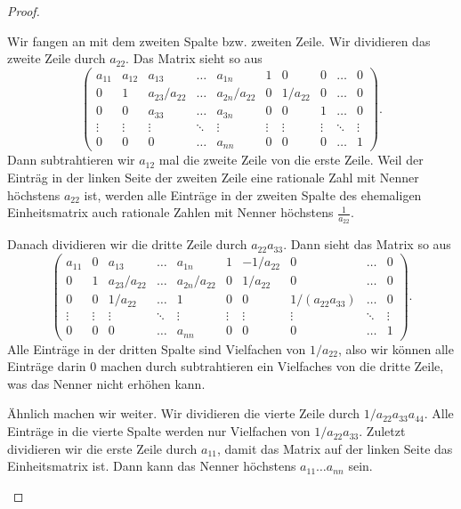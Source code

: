 \begin{proof}
\begin{parts}
		Wir fangen an mit dem zweiten Spalte bzw. zweiten Zeile. Wir dividieren das zweite Zeile durch $a_{22}$. Das Matrix sieht so aus
		\[
			\left( 
				\begin{array}{ccccc|ccccc}
					a_{11} & a_{12} & a_{13} & \dots & a_{1n} & 1 & 0 & 0 & \dots & 0\\
					0 & 1 & a_{23} / a_{22} & \dots & a_{2n} / a_{22} & 0 & 1 / a_{22} & 0 & \dots & 0\\
					0 & 0 & a_{33} & \dots & a_{3n} & 0 & 0 & 1 & \dots & 0\\
					\vdots & \vdots & \vdots & \ddots & \vdots & \vdots & \vdots & \vdots & \ddots & \vdots \\
					0 & 0 & 0 & \dots & a_{nn} & 0 & 0 & 0 & \dots & 1
				\end{array}
			\right)  
		.\] 
		Dann subtrahtieren wir $a_{12}$ mal die zweite Zeile von die erste Zeile. Weil der Einträg in der linken Seite der zweiten Zeile eine rationale Zahl mit Nenner höchstens $a_{22}$ ist, werden alle Einträge in der zweiten Spalte des ehemaligen Einheitsmatrix auch rationale Zahlen mit Nenner höchstens $\frac{1}{a_{22}}$.

		Danach dividieren wir die dritte Zeile durch $a_{22}a_{33}$. Dann sieht das Matrix so aus
			\[
		\left( 
		\begin{array}{ccccc|ccccc}
			a_{11} & 0 & a_{13} & \dots & a_{1n} & 1 & -1/a_{22} & 0 & \dots & 0\\
			0 & 1 & a_{23} / a_{22} & \dots & a_{2n} / a_{22} & 0 & 1 / a_{22} & 0 & \dots & 0\\
			0 & 0 & 1/a_{22} & \dots & 1 & 0 & 0 & 1/(a_{22}a_{33}) & \dots & 0\\
			\vdots & \vdots & \vdots & \ddots & \vdots & \vdots & \vdots & \vdots & \ddots & \vdots \\
			0 & 0 & 0 & \dots & a_{nn} & 0 & 0 & 0 & \dots & 1
		\end{array}
		\right)  
		.\] 
		Alle Einträge in der dritten Spalte sind Vielfachen von $1/a_{22}$, also wir können alle Einträge darin $0$ machen durch subtrahtieren ein Vielfaches von die dritte Zeile, was das Nenner nicht erhöhen kann. 
		
		Ähnlich machen wir weiter. Wir dividieren die vierte Zeile durch $1/a_{22}a_{33}a_{44}$. Alle Einträge in die vierte Spalte werden nur Vielfachen von $1/a_{22}a_{33}$. Zuletzt dividieren wir die erste Zeile durch $a_{11}$, damit das Matrix auf der linken Seite das Einheitsmatrix ist. Dann kann das Nenner höchstens $a_{11}\dots a_{nn}$ sein.\qedhere
	\end{parts}
\end{proof}
